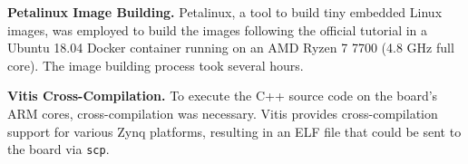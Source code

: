 \textbf{Petalinux Image Building.} Petalinux, a tool to build tiny embedded Linux images, was employed to build the images following the official tutorial in a Ubuntu 18.04 Docker container running on an AMD Ryzen 7 7700 (4.8 GHz full core). The image building process took several hours.

\textbf{Vitis Cross-Compilation.} To execute the C++ source code on the board's ARM cores, cross-compilation was necessary. Vitis provides cross-compilation support for various Zynq platforms, resulting in an ELF file that could be sent to the board via \verb|scp|.
